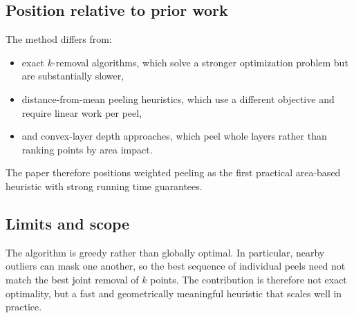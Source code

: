 \subsection*{Position relative to prior work}
The method differs from:
\begin{itemize}
    \item exact $k$-removal algorithms, which solve a stronger optimization problem but are substantially slower,
    \item distance-from-mean peeling heuristics, which use a different objective and require linear work per peel,
    \item and convex-layer depth approaches, which peel whole layers rather than ranking points by area impact.
\end{itemize}
The paper therefore positions weighted peeling as the first practical area-based heuristic with strong running time guarantees.

\subsection*{Limits and scope}
The algorithm is greedy rather than globally optimal. In particular, nearby outliers can mask one another, so the best sequence of individual peels need not match the best joint removal of $k$ points. The contribution is therefore not exact optimality, but a fast and geometrically meaningful heuristic that scales well in practice.

